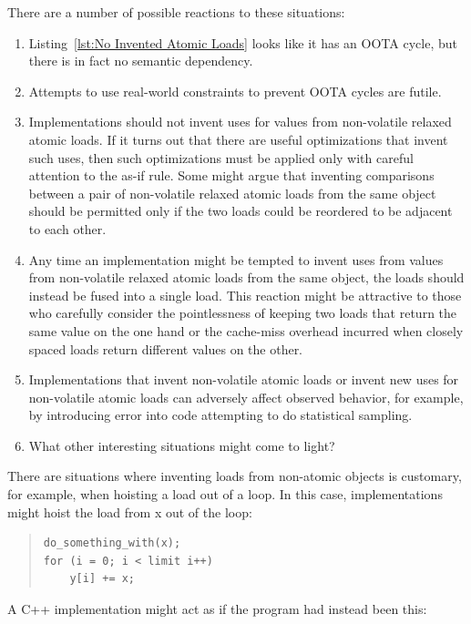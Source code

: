 \documentclass[10]{article}
\begin{document}
There are a number of possible reactions to these situations:

\begin{enumerate}
\item	Listing~\ref{lst:No Invented Atomic Loads}
	looks like it has an OOTA cycle, but there is in fact no
	semantic dependency.
\item	Attempts to use real-world constraints to prevent OOTA cycles
	are futile.
\item	Implementations should not invent uses for values from
	non-volatile relaxed atomic loads.
	If it turns out that there are useful optimizations that invent
	such uses, then such optimizations must be applied only with
	careful attention to the as-if rule.
	Some might argue that inventing comparisons between a pair of
	non-volatile relaxed atomic loads from the same object should
	be permitted only if the two loads could be reordered to be
	adjacent to each other.
\item	Any time an implementation might be tempted to invent uses from
	values from non-volatile relaxed atomic loads from the same
	object, the loads should instead be fused into a single load.
	This reaction might be attractive to those who carefully consider
	the pointlessness of keeping two loads that return the same value
	on the one hand or the cache-miss overhead incurred when closely
	spaced loads return different values on the other.
\item	Implementations that invent non-volatile atomic loads or invent
	new uses for non-volatile atomic loads can adversely affect
	observed behavior, for example, by introducing error into code
	attempting to do statistical sampling.
\item	What other interesting situations might come to light?
\end{enumerate}

There are situations where inventing loads from non-atomic objects
is customary, for example, when hoisting a load out of a loop.
In this case, implementations might hoist the load from x out of
the loop:

\begin{quote}
\begin{verbatim}
do_something_with(x);
for (i = 0; i < limit i++)
	y[i] += x;
\end{verbatim}
\end{quote}

A C++ implementation might act as if the program had instead been this:
\end{document}
